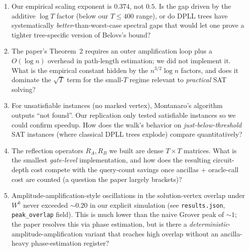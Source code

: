 \documentclass[11pt]{article}
\begin{document}
\begin{enumerate}
  \item[\textbf{Q1}] Our empirical scaling exponent is $0.374$, not $0.5$. Is the
    gap driven by the additive $\log T$ factor (below our $T\le400$ range), or
    do DPLL trees have systematically \emph{better}-than-worst-case spectral
    gaps that would let one prove a tighter tree-specific version of
    Belovs's bound?
  \item[\textbf{Q2}] The paper's Theorem~2 requires an outer amplification loop
    plus a $O(\log n)$ overhead in path-length estimation; we did not
    implement it. What is the empirical constant hidden by the
    $n^{3/2}\log n$ factors, and does it dominate the $\sqrt{T}$ term for
    the small-$T$ regime relevant to \emph{practical} SAT solving?
  \item[\textbf{Q3}] For unsatisfiable instances (no marked vertex),
    Montanaro's algorithm outputs ``not found''. Our replication only tested
    satisfiable instances so we could confirm speedup. How does the walk's
    behavior on \emph{just-below-threshold} SAT instances (where classical
    DPLL trees explode) compare quantitatively?
  \item[\textbf{Q4}] The reflection operators $R_A, R_B$ we built are dense
    $T\times T$ matrices. What is the smallest \emph{gate-level}
    implementation, and how does the resulting circuit-depth cost compete
    with the query-count savings once ancillas + oracle-call cost are
    counted (a question the paper largely brackets)?
  \item[\textbf{Q5}] Amplitude-amplification-style oscillations in the
    solution-vertex overlap under $W^k$ never exceeded $\sim 0.20$ in our
    explicit simulation (see \texttt{results.json}, \texttt{peak\_overlap}
    field). This is much lower than the naive Grover peak of $\sim 1$; the
    paper resolves this via phase estimation, but is there a
    \emph{deterministic}-amplitude-amplification variant that reaches high
    overlap without an ancilla-heavy phase-estimation register?
\end{enumerate}
\end{document}
